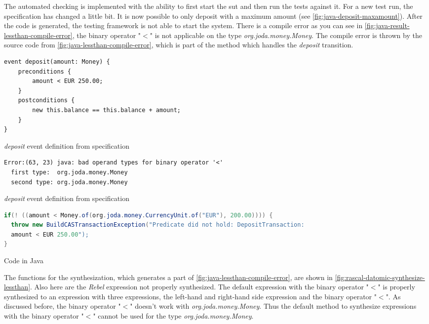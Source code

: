 The automated checking is implemented with the ability to first start the
\gls{sut} and then run the tests against it. For a new test run, the
specification has changed a little bit. It is now possible to only deposit with
a maximum amount (see \autoref{fig:java-deposit-maxamount}). After the code is
generated, the testing framework is not able to start the system. There is a
compile error as you can see in
\autoref{fig:java-result-lessthan-compile-error}, the binary operator "$<$"
is not applicable on the type \textit{org.joda.money.Money}. The compile error
is thrown by the source code from \autoref{fig:java-lessthan-compile-error},
which is part of the method which handles the \textit{deposit} transition.


\begin{sourcecode}[h!]
\begin{lstlisting}[]
event deposit(amount: Money) {
	preconditions {
		amount < EUR 250.00;
	}
	postconditions {
		new this.balance == this.balance + amount;
	}
}
\end{lstlisting}
\caption{\textit{deposit} event definition from specification}\label{fig:java-deposit-maxamount}
\end{sourcecode}
\FloatBarrier

\begin{sourcecode}[h!]
\begin{lstlisting}[]
Error:(63, 23) java: bad operand types for binary operator '<'
  first type:  org.joda.money.Money
  second type: org.joda.money.Money
\end{lstlisting}
\caption{\textit{deposit} event definition from specification}\label{fig:java-result-lessthan-compile-error}
\end{sourcecode}
\FloatBarrier

\begin{sourcecode}[h!]
\begin{lstlisting}[language=Java]
if(! ((amount < Money.of(org.joda.money.CurrencyUnit.of("EUR"), 200.00)))) {
  throw new BuildCASTransactionException("Predicate did not hold: DepositTransaction:
  amount < EUR 250.00");
}
\end{lstlisting}
\caption{Code in Java}\label{fig:java-lessthan-compile-error}
\end{sourcecode}
\FloatBarrier

The functions for the synthesization, which generates a part of
\autoref{fig:java-lessthan-compile-error}, are shown in
\autoref{fig:rascal-datomic-synthesize-lessthan}. Also here are the \textit{Rebel}
expression not properly synthesized. The default expression with the binary
operator "$<$" is properly synthesized to an expression with three expressions,
the left-hand and right-hand side expression and the binary operator "$<$".
As discussed before, the binary operator "$<$" doesn't work with
\textit{org.joda.money.Money}. Thus the default method to synthesize expressions
with the binary operator "$<$" cannot be used for the type
\textit{org.joda.money.Money}.

